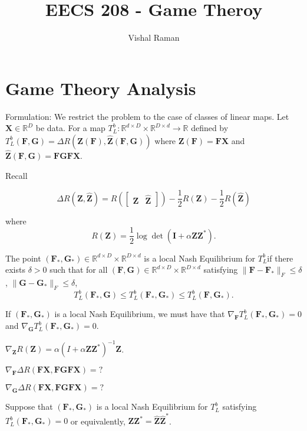 \documentclass[11pt]{scrartcl}
\newcommand{\Z}{\mathbf{Z}}
\newcommand{\Zh}{\mathbf{\widehat{Z}}}
\newcommand{\F}{\mathbf{F}}
\newcommand{\G}{\mathbf{G}}
\newcommand{\R}{\mathbb{R}}
\newcommand{\X}{\mathbf{X}}
\let \grad \nabla
\begin{document}
\title{EECS 208 - Game Theroy}
\author{Vishal Raman}
\section{Game Theory Analysis}
Formulation:  We restrict the problem to the case of classes of linear maps.  Let $\X \in \R^D$ be data.  For a map $T_L^b: \R^{d \times D} \times \R^{D \times d} \to \R$ defined by $T_L^b(\F, \G) = \Delta R (\Z(\F), \Zh(\F, \G))$ where $\Z(\F) = \F\X$ and $\Zh(\F, \G) = \F\G\F\X$.  

Recall 

$$   \Delta R(\Z, \Zh) = R\left(\begin{bmatrix}
     \Z & \Zh
     \end{bmatrix}\right) - \frac{1}{2}R(\Z) - \frac{1}{2} R(\Zh)$$

where 
$$R(\Z) = \frac{1}{2} \log \det \left(\mathbf{I}+ \alpha \Z\Z^*\right).$$
\begin{definition} The point $(\F_*, \G_*) \in \R^{d \times D} \times \R^{D \times d}$ is a local Nash Equilibrium for $T_L^b$if there exists $\delta > 0$ such that for all $(\F, \G) \in \R^{d \times D} \times \R^{D \times d}$ satisfying $\|\F - \F_*\|_F \le \delta$, $\|\G - \G_*\|_F \le \delta$,
$$T_L^b(\F_*, \G) \le T_L^b(\F_*, \G_*) \le T_L^b(\F, \G_*).$$ 
\end{definition}

\begin{proposition} If $(\F_*, \G_*)$ is a local Nash Equilibrium, we must have that $\nabla_{\F}T_L^b(\F_*, \G_*) = 0$ and $\nabla_\G T_L^b(\F_*, \G_*) = 0$.
\end{proposition}

\begin{fact} $\grad_{\Z} R(\Z) = \alpha (I + \alpha \Z\Z^*)^{-1}\Z$.
\end{fact}


\begin{fact} $\grad_{\F} \Delta R(\F\X, \F\G\F\X) = ?$
\end{fact}


\begin{fact} $\grad_{\G} \Delta R(\F\X,\F\G\F\X) = ?$
\end{fact}

\begin{theorem} Suppose that $(\F_*, \G_*)$ is a local Nash Equilibrium for $T_L^b$ satisfying $T_L^b(\F_*, \G_*) = 0$ or equivalently, $\Z\Z^* = \Zh\Zh^*$.
\end{theorem}
\end{document}

